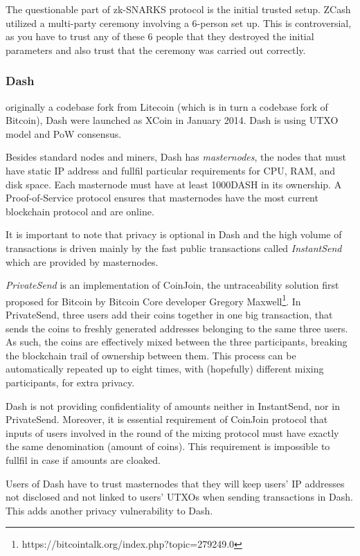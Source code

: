 \documentclass[a4paper, 10pt, conference]{ieeeconf}
\begin{document}
The questionable part of zk-SNARKS protocol is the initial trusted setup. ZCash utilized a multi-party ceremony involving a 6-person set up. This is controversial, as you have to trust any of
these 6 people that they destroyed the initial parameters and also trust that the ceremony was carried out correctly. 

\subsubsection{Dash}

originally a codebase fork from Litecoin (which is in turn a codebase fork of Bitcoin), Dash were launched as XCoin in January 2014. Dash is using UTXO model and PoW consensus. 

Besides standard nodes and miners, Dash has \textit{masternodes}, the nodes that must have static IP address and fullfil particular requirements for CPU, RAM, and disk space. Each masternode must have at least 1000DASH in its ownership. A Proof-of-Service protocol ensures that masternodes have the most current blockchain protocol and are online. 

It is important to note that privacy is optional in Dash and the high volume of transactions is driven mainly by the fast public transactions called \textit{InstantSend} which are provided by masternodes.

\textit{PrivateSend} is an implementation of CoinJoin, the untraceability solution first proposed for Bitcoin by Bitcoin Core developer Gregory Maxwell\footnote{https://bitcointalk.org/index.php?topic=279249.0}. In PrivateSend, three users add their coins together in one big transaction, that sends the coins to freshly generated addresses belonging to the same three users. As such, the coins are effectively mixed between the three participants, breaking the blockchain trail of ownership between them. This process can be automatically repeated up to eight times, with (hopefully) different mixing participants, for extra privacy.

Dash is not providing confidentiality of amounts neither in InstantSend, nor in PrivateSend. Moreover, it is essential requirement of CoinJoin protocol that inputs of users involved in the round of the mixing protocol must have exactly the same denomination (amount of coins). This requirement is impossible to fullfil in case if amounts are cloaked. 

Users of Dash have to trust masternodes that they will keep users' IP addresses not disclosed and not linked to users' UTXOs when sending transactions in Dash. This adds another privacy vulnerability to Dash.
\end{document}
